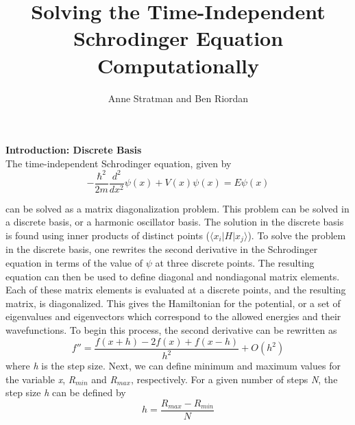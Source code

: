 \documentclass[%
 reprint,
 amsmath,amssymb,
 aps,
]{revtex4-1}
\begin{document}



\title{Solving the Time-Independent Schrodinger Equation Computationally}

\author{Anne Stratman and Ben Riordan}
%

\maketitle								%





\noindent \textbf{Introduction: Discrete Basis}\\

\noindent The time-independent Schrodinger equation, given by
\begin{equation}
-\frac{\hbar^2}{2m}\frac{d^2}{dx^2}\psi(x)+V(x)\psi(x)=E\psi(x)
\end{equation}

\noindent can be solved as a matrix diagonalization problem.  This problem can be solved in a discrete basis, or a harmonic oscillator basis.  The solution in the discrete basis is found using inner products of distinct points ($\langle x_i|H|x_j\rangle$).  To solve the problem in the discrete basis, one rewrites the second derivative in the Schrodinger equation in terms of the value of $\psi$ at three discrete points.  The resulting equation can then be used to define diagonal and nondiagonal matrix elements.  Each of these matrix elements is evaluated at a discrete points, and the resulting matrix, is diagonalized.  This gives the Hamiltonian for the potential, or a set of eigenvalues and eigenvectors which correspond to the allowed energies and their wavefunctions.  To begin this process, the second derivative can be rewritten as
\begin{equation}
f''=\frac{f(x+h)-2f(x)+f(x-h)}{h^2}+O(h^2)
\end{equation}
\noindent where \textit{h} is the step size.  Next, we can define minimum and maximum values for the variable \textit{x}, \textit{R}$_{min}$ and \textit{R}$_{max}$, respectively.  For a given number of steps \textit{N}, the step size \textit{h} can be defined by
\begin{equation}
h=\frac{R_{max}-R_{min}}{N}
\end{equation}
\end{document}
